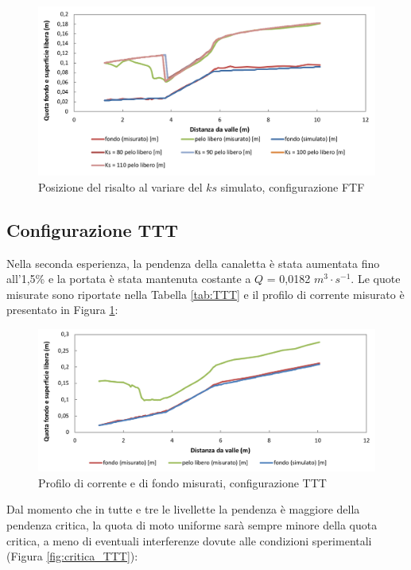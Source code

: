 \documentclass[12pt]{article} %
\begin{document}
\begin{figure}[H]
    \centering
    \includegraphics[width=\textwidth]{FTFrisalto5.5.png}
    \caption{Posizione del risalto al variare del $ks$ simulato, configurazione FTF}
\end{figure}

\subsection{Configurazione TTT}

\noindent Nella seconda esperienza, la pendenza della canaletta è stata aumentata fino all’1,5\% e la portata è stata mantenuta costante a $Q$ = 0,0182 $m^3\cdot s^{-1}$. 
Le quote misurate sono riportate nella Tabella \ref{tab:TTT} e il profilo di corrente misurato è presentato in Figura \ref{fig:profilo_TTT}:

\begin{figure}[H]
    \centering
    \includegraphics[width=\textwidth]{TTTbase.png}
    \caption{Profilo di corrente e di fondo misurati, configurazione TTT}
    \label{fig:profilo_TTT}
\end{figure}

\noindent Dal momento che in tutte e tre le livellette la pendenza è maggiore della pendenza critica, la quota di moto uniforme sarà sempre minore della quota critica, a meno di eventuali interferenze dovute alle condizioni sperimentali (Figura \ref{fig:critica_TTT}): 
\end{document}
